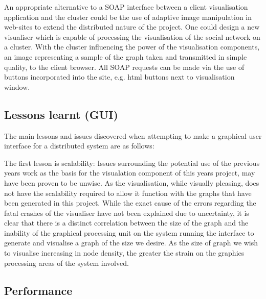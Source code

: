 An appropriate alternative to a SOAP interface between a client visualisation application and the cluster could be the use of adaptive image manipulation in web-sites to extend the distributed nature of the project. One could design a new visualiser which is capable of processing the visualisation of the social network on a cluster. With the cluster influencing the power of the visualisation components, an image representing a sample of the graph taken and transmitted in simple quality, to the client browser. All SOAP requests can be made via the use of buttons incorporated into the site, e.g. html buttons next to visualisation window. 




\subsection{Lessons learnt (GUI)}

The main lessons and issues discovered when attempting to make a graphical user interface for a distributed system are as follows:

The first lesson is scalability:
Issues surrounding the potential use of the previous years work as the basis for the visualation component of this years project, may have been proven to be unwise. As the visualisation, while visually pleasing, does not have the scalability required to allow it function with the graphs that have been generated in this project. While the exact cause of the errors regarding the fatal crashes of the visualiser have not been explained due to uncertainty, it is clear that there is a distinct correlation between the size of the graph and the inability of the graphical processing unit on the system running the interface to generate and visualise a graph of the size we desire. As the size of graph we wish to visualise increasing in node density, the greater the strain on the graphics processing areas of the system involved. 

\subsection{Performance}

